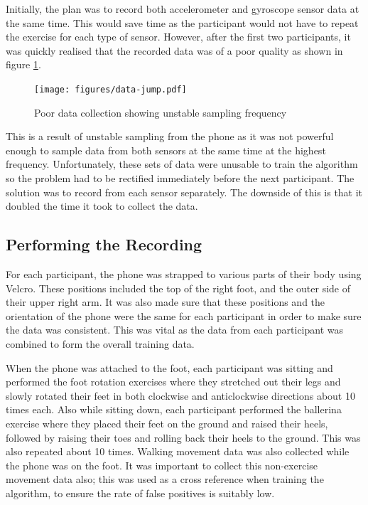 Initially, the plan was to record both accelerometer and gyroscope sensor data at the same time. This would save time as the participant would not have to repeat the exercise for each type of sensor. However, after the first two participants, it was quickly realised that the recorded data was of a poor quality as shown in figure \ref{fig:bad-data}.

\begin{figure}
	\centering
	\texttt{[image: figures/data-jump.pdf]}
	\caption{Poor data collection showing unstable sampling frequency\label{fig:bad-data}}
\end{figure}

This is a result of unstable sampling from the phone as it was not powerful enough to sample data from both sensors at the same time at the highest frequency. Unfortunately, these sets of data were unusable to train the algorithm so the problem had to be rectified immediately before the next participant. The solution was to record from each sensor separately. The downside of this is that it doubled the time it took to collect the data.

\subsection{Performing the Recording}
For each participant, the phone was strapped to various parts of their body using Velcro. These positions included the top of the right foot, and the outer side of their upper right arm. It was also made sure that these positions and the orientation of the phone were the same for each participant in order to make sure the data was consistent. This was vital as the data from each participant was combined to form the overall training data.

When the phone was attached to the foot, each participant was sitting and performed the foot rotation exercises where they stretched out their legs and slowly rotated their feet in both clockwise and anticlockwise directions about 10 times each. Also while sitting down, each participant performed the ballerina exercise where they placed their feet on the ground and raised their heels, followed by raising their toes and rolling back their heels to the ground. This was also repeated about 10 times. Walking movement data was also collected while the phone was on the foot. It was important to collect this non-exercise movement data also; this was used as a cross reference when training the algorithm, to ensure the rate of false positives is suitably low.

